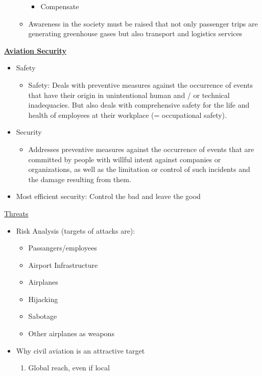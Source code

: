 \documentclass[9pt, landscape, fleqn]{scrartcl}
\begin{document}
\begin{multicols*}{3}
\begin{itemize}
\begin{itemize}
\begin{itemize}
            \item Compensate 
        \end{itemize}
        \item Awareness in the society must be raised that not only passenger trips are generating greenhouse gases but also transport and logistics services
    \end{itemize}
\end{itemize}
\underline{\textbf{Aviation Security}}
\begin{itemize}
    \item Safety 
    \begin{itemize}
        \item Safety: Deals with preventive measures against the occurrence of events that have their origin in unintentional human and / or technical inadequacies.
        But also deals with comprehensive safety for the life and health of employees at their workplace (= occupational safety).
    \end{itemize}
    \item Security 
    \begin{itemize}
        \item Addresses preventive measures against the occurrence of events that are committed by people with willful intent against companies or organizations, as well as the limitation or control of such incidents and the damage resulting
        from them.
    \end{itemize}
    \item Most efficient security: Control the bad and leave the good
\end{itemize}
\underline{Threats}
\begin{itemize}
    \item Risk Analysis (targets of attacks are): 
    \begin{itemize}
        \item Passangers/employees 
        \item Airport Infrastructure
        \item Airplanes 
        \item Hijacking 
        \item Sabotage 
        \item Other airplanes as weapons 
    \end{itemize}
    \item Why civil aviation is an attractive target
    \begin{enumerate}
        \item Global reach, even if local 

\end{enumerate}
\end{itemize}
\end{multicols*}
\end{document}
